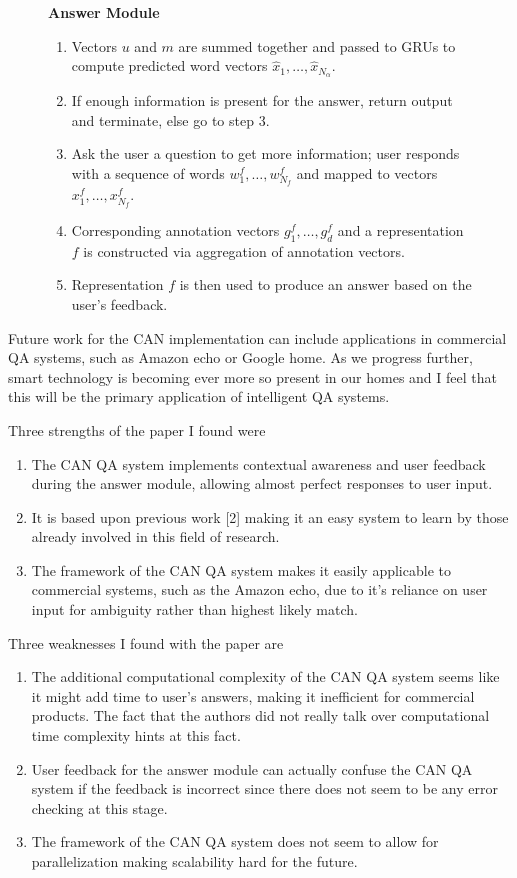 \documentclass[12pt]{article}
\theoremstyle{remark}
\begin{document}
\begin{figure}[!htb]
	\textbf{Answer Module}
	\begin{enumerate}[wide, labelwidth=!, labelindent=0pt]
	\item Vectors $u$ and $m$ are summed together and passed to GRUs to compute predicted word vectors $\hat{x}_1, \dots, \hat{x}_{N_\alpha}$.
	\item If enough information is present for the answer, return output and terminate, else go to step 3.
	\item Ask the user a question to get more information; user responds with a sequence of words $w_1^f, \dots, w^f_{N_f}$ and mapped to vectors $x_1^f, \dots, x_{N_f}^f$.
	\item Corresponding annotation vectors $g_1^f, \dots, g_d^f$ and a representation $f$ is constructed via aggregation of annotation vectors.  
	\item Representation $f$ is then used to produce an answer based on the user's feedback.
	\end{enumerate}
	\endminipage\hfill
\end{figure}

Future work for the CAN implementation can include applications in commercial QA systems, such as Amazon echo or Google home. As we progress further, smart technology is becoming ever more so present in our homes and I feel that this will be the primary application of intelligent QA systems.

\vspace{0.25cm}
Three strengths of the paper I found were 
\begin{enumerate}
	\item The CAN QA system implements contextual awareness and user feedback during the answer module, allowing almost perfect responses to user input. 
	\item It is based upon previous work [2] making it an easy system to learn by those already involved in this field of research.
	\item The framework of the CAN QA system makes it easily applicable to commercial systems, such as the Amazon echo, due to it's reliance on user input for ambiguity rather than highest likely match.  
\end{enumerate}

\vspace{0.25cm}
Three weaknesses I found with the paper are 
\begin{enumerate}
	\item The additional computational complexity of the CAN QA system seems like it might add time to user's answers, making it inefficient for commercial products. The fact that the authors did not really talk over computational time complexity hints at this fact.
	\item User feedback for the answer module can actually confuse the CAN QA system if the feedback is incorrect since there does not seem to be any error checking at this stage.
	\item The framework of the CAN QA system does not seem to allow for parallelization making scalability hard for the future. 
\end{enumerate}
\end{document}
